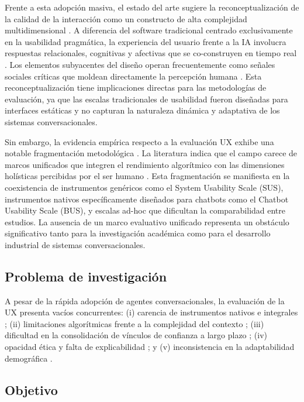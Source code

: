 \documentclass[11pt,twocolumn]{article}
\begin{document}
Frente a esta adopción masiva, el estado del arte sugiere la reconceptualización de la calidad de la interacción como un constructo de alta complejidad multidimensional \cite{marconi2026}. A diferencia del software tradicional centrado exclusivamente en la usabilidad pragmática, la experiencia del usuario frente a la IA involucra respuestas relacionales, cognitivas y afectivas que se co-construyen en tiempo real \cite{borsci2021}. Los elementos subyacentes del diseño operan frecuentemente como señales sociales críticas que moldean directamente la percepción humana \cite{wang2025}. Esta reconceptualización tiene implicaciones directas para las metodologías de evaluación, ya que las escalas tradicionales de usabilidad fueron diseñadas para interfaces estáticas y no capturan la naturaleza dinámica y adaptativa de los sistemas conversacionales.

Sin embargo, la evidencia empírica respecto a la evaluación UX exhibe una notable fragmentación metodológica \cite{folstad2021}. La literatura indica que el campo carece de marcos unificados que integren el rendimiento algorítmico con las dimensiones holísticas percibidas por el ser humano \cite{marconi2026}. Esta fragmentación se manifiesta en la coexistencia de instrumentos genéricos como el System Usability Scale (SUS), instrumentos nativos específicamente diseñados para chatbots como el Chatbot Usability Scale (BUS), y escalas ad-hoc que dificultan la comparabilidad entre estudios. La ausencia de un marco evaluativo unificado representa un obstáculo significativo tanto para la investigación académica como para el desarrollo industrial de sistemas conversacionales.

\subsection{Problema de investigación}

A pesar de la rápida adopción de agentes conversacionales, la evaluación de la UX presenta vacíos concurrentes: (i) carencia de instrumentos nativos e integrales \cite{borsci2021, borsci2022}; (ii) limitaciones algorítmicas frente a la complejidad del contexto \cite{folstad2021}; (iii) dificultad en la consolidación de vínculos de confianza a largo plazo \cite{he2022}; (iv) opacidad ética y falta de explicabilidad \cite{jannach2022}; y (v) inconsistencia en la adaptabilidad demográfica \cite{wang2025}.

\subsection{Objetivo}
\end{document}
